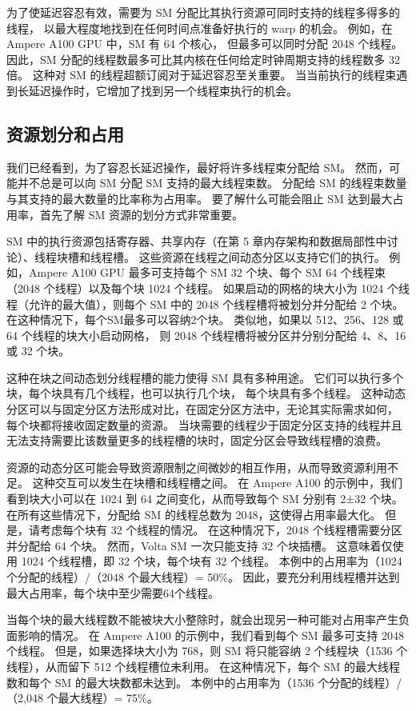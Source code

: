 为了使延迟容忍有效，需要为 SM 分配比其执行资源可同时支持的线程多得多的线程，
以最大程度地找到在任何时间点准备好执行的 warp 的机会。 例如，在 Ampere A100 GPU 中，SM 有 64 个核心，
但最多可以同时分配 2048 个线程。 因此，SM 分配的线程数最多可比其内核在任何给定时钟周期支持的线程数多 32 倍。 
这种对 SM 的线程超额订阅对于延迟容忍至关重要。 当当前执行的线程束遇到长延迟操作时，它增加了找到另一个线程束执行的机会。

\subsection{资源划分和占用}
我们已经看到，为了容忍长延迟操作，最好将许多线程束分配给 SM。 然而，可能并不总是可以向 SM 分配 SM 支持的最大线程束数。 
分配给 SM 的线程束数量与其支持的最大数量的比率称为占用率。 
要了解什么可能会阻止 SM 达到最大占用率，首先了解 SM 资源的划分方式非常重要。

SM 中的执行资源包括寄存器、共享内存（在第 5 章内存架构和数据局部性中讨论）、线程块槽和线程槽。 
这些资源在线程之间动态分区以支持它们的执行。 
例如，Ampere A100 GPU 最多可支持每个 SM 32 个块、每个 SM 64 个线程束（2048 个线程）以及每个块 1024 个线程。 
如果启动的网格的块大小为 1024 个线程（允许的最大值），则每个 SM 中的 2048 个线程槽将被划分并分配给 2 个块。 
在这种情况下，每个SM最多可以容纳2个块。 类似地，如果以 512、256、128 或 64 个线程的块大小启动网格，
则 2048 个线程槽将被分区并分别分配给 4、8、16 或 32 个块。

这种在块之间动态划分线程槽的能力使得 SM 具有多种用途。 它们可以执行多个块，每个块具有几个线程，也可以执行几个块，
每个块具有多个线程。 这种动态分区可以与固定分区方法形成对比，在固定分区方法中，无论其实际需求如何，
每个块都将接收固定数量的资源。 当块需要的线程少于固定分区支持的线程并且无法支持需要比该数量更多的线程槽的块时，固定分区会导致线程槽的浪费。

资源的动态分区可能会导致资源限制之间微妙的相互作用，从而导致资源利用不足。 这种交互可以发生在块槽和线程槽之间。 
在 Ampere A100 的示例中，我们看到块大小可以在 1024 到 64 之间变化，从而导致每个 SM 分别有 2±32 个块。 
在所有这些情况下，分配给 SM 的线程总数为 2048，这使得占用率最大化。 但是，请考虑每个块有 32 个线程的情况。 
在这种情况下，2048 个线程槽需要分区并分配给 64 个块。 然而，Volta SM 一次只能支持 32 个块插槽。 
这意味着仅使用 1024 个线程槽，即 32 个块，每个块有 32 个线程。 
本例中的占用率为（1024 个分配的线程）/（2048 个最大线程）= 50\%。 
因此，要充分利用线程槽并达到最大占用率，每个块中至少需要64个线程。

当每个块的最大线程数不能被块大小整除时，就会出现另一种可能对占用率产生负面影响的情况。 
在 Ampere A100 的示例中，我们看到每个 SM 最多可支持 2048 个线程。 
但是，如果选择块大小为 768，则 SM 将只能容纳 2 个线程块（1536 个线程），从而留下 512 个线程槽位未利用。 
在这种情况下，每个 SM 的最大线程数和每个 SM 的最大块数都未达到。 
本例中的占用率为（1536 个分配的线程）/（2,048 个最大线程）= 75\%。

